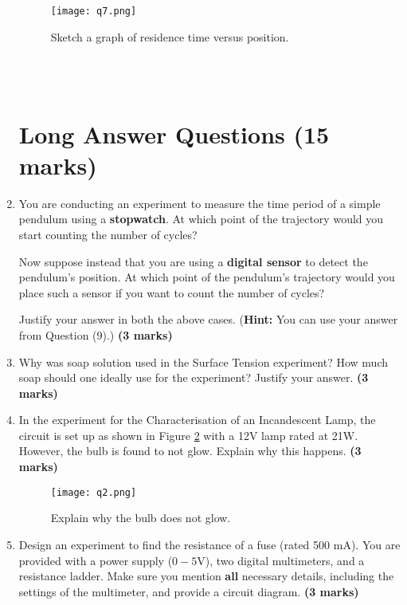 \begin{enumerate}
\begin{figure}[!htb]
\centering
\texttt{[image: q7.png]}
\caption{Sketch a graph of residence time versus position.}
\label{resGraph}
\end{figure}

\newpage
~\\
~\\
\newpage
\section*{Long Answer Questions \hfill (15 marks)}



\item You are conducting an experiment to measure the time period of a simple pendulum using a \textbf{stopwatch}. At which point of the trajectory would you start counting the number of cycles? 

Now suppose instead that you are using a \textbf{digital sensor} to detect the pendulum's position. At which point of the pendulum's trajectory would you place such a sensor if you want to count the number of cycles?

Justify your answer in both the above cases. (\textbf{Hint:} You can use your answer from Question (9).)  \hfill \textbf{(3 marks)}


\item Why was soap solution used in the Surface Tension experiment? How much soap should one ideally use for the experiment? Justify your answer. \hfill \textbf{(3 marks)}



\item In the experiment for the Characterisation of an Incandescent Lamp, the circuit is set up as shown in Figure \ref{incandCirc} with a 12V lamp rated at 21W. However, the bulb is found to not glow. Explain why this happens.  \hfill \textbf{(3 marks)}

\begin{figure}[!htb]
\centering
\texttt{[image: q2.png]}
\caption{Explain why the bulb does not glow.}
\label{incandCirc}
\end{figure}


\item Design an experiment to find the resistance of a fuse (rated 500 mA). You are provided with a power supply ($0-5$V), two digital multimeters, and a resistance ladder. Make sure you mention \textbf{all} necessary details, including the settings of the multimeter, and provide a circuit diagram. \hfill \textbf{(3 marks)}




\end{enumerate}
